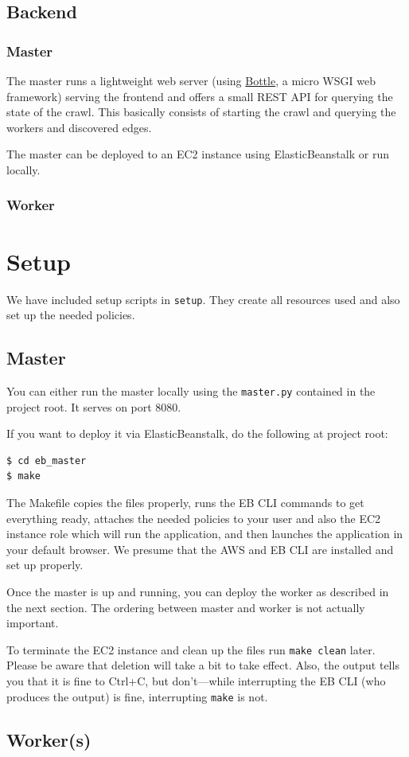 \documentclass[english]{scrartcl}
\begin{document}
\subsection{Backend}

\subsubsection{Master}

The master runs a lightweight web server (using
\href{https://bottlepy.org/docs/dev/}{Bottle}, a micro WSGI web framework)
serving the frontend and offers a small REST API for querying the state of the
crawl. This basically consists of starting the crawl and querying the workers
and discovered edges.

The master can be deployed to an EC2 instance using ElasticBeanstalk or run
locally.

\subsubsection{Worker}

\section{Setup}

We have included setup scripts in \texttt{setup}. They create all resources
used and also set up the needed policies. %

\subsection{Master}

You can either run the master locally using the \texttt{master.py} contained
in the project root. It serves on port 8080.

If you want to deploy it via ElasticBeanstalk, do the following at project
root:

\begin{verbatim}
$ cd eb_master
$ make
\end{verbatim}

The Makefile copies the files properly, runs the EB CLI commands to get
everything ready, attaches the needed policies to your user and also the EC2
instance role which will run the application, and then launches the application
in your default browser. We presume that the AWS and EB CLI are installed and
set up properly.

Once the master is up and running, you can deploy the worker as described in
the next section. The ordering between master and worker is not actually
important.

To terminate the EC2 instance and clean up the files run \texttt{make clean}
later. Please be aware that deletion will take a bit to take effect. Also, the
output tells you that it is fine to Ctrl+C, but don't---while interrupting the
EB CLI (who produces the output) is fine, interrupting \texttt{make} is not.

\subsection{Worker(s)}
\end{document}
